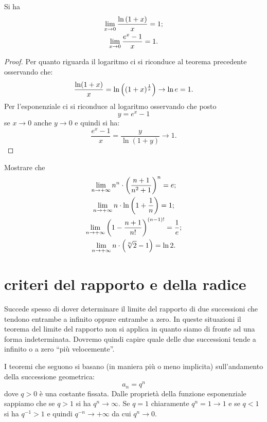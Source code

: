 \begin{corollary}\label{cor:limite_notevole_e}
\mymark{*}%
Si ha
\begin{gather}
 \lim_{x\to 0} \frac{\ln {\left( 1+ x \right)}}{x} = 1; \\
 \lim_{x\to 0} \frac{e^x-1}{x} = 1.
\end{gather}
\end{corollary}
%
\begin{proof}
Per quanto riguarda il logaritmo ci si riconduce al teorema precedente
osservando che:
\[
  \frac{\ln(1+x)}{x}
  = \ln {\left( (1+x)^{\frac 1 {x}} \right)}
  \to \ln e = 1.
\]
Per l'esponenziale ci si riconduce al logaritmo
osservando che posto
\[
  y = e^x-1
\]
se $x\to 0$ anche $y\to 0$ e quindi si ha:
\[
\frac{e^{x}-1}{x} = \frac{y}{\ln(1+y)} \to 1.
\]

\end{proof}

\begin{exercise}
Mostrare che
\begin{gather*}
  \lim_{n\to+\infty} n^n\cdot {\left( \frac{n+1}{n^2+1} \right)}^n = e; \\
  \lim_{n\to+\infty} n\cdot \ln{\left( 1 + \frac 1 n \right)} = 1; \\
  \lim_{n\to+\infty} {\left( 1-\frac{n+1}{n!} \right)}^{(n-1)!} = \frac 1 e; \\
  \lim_{n\to+\infty} n \cdot {\left( \sqrt[n]{2}-1 \right)} = \ln 2.
\end{gather*}
\end{exercise}

\section{criteri del rapporto e della radice}

Succede spesso di dover determinare il limite
del rapporto di due successioni che tendono entrambe a infinito
oppure entrambe a zero.
In queste situazioni il teorema del limite del rapporto non
si applica in quanto siamo di fronte ad una forma indeterminata.
Dovremo quindi capire quale delle due successioni
tende a infinito o a zero ``più velocemente''.

I teoremi che seguono si basano (in maniera più o meno implicita)
sull'andamento della successione geometrica:
\[
  a_n = q^n
\]
dove $q>0$ è una costante fissata.
Dalle proprietà della funzione esponenziale 
sappiamo che se $q>1$ si ha $q^n\to \infty$.
Se $q=1$ chiaramente $q^n=1\to 1$
e se $q<1$ si ha $q^{-1}>1$ e quindi $q^{-n} \to +\infty$
da cui $q^n \to 0$.

